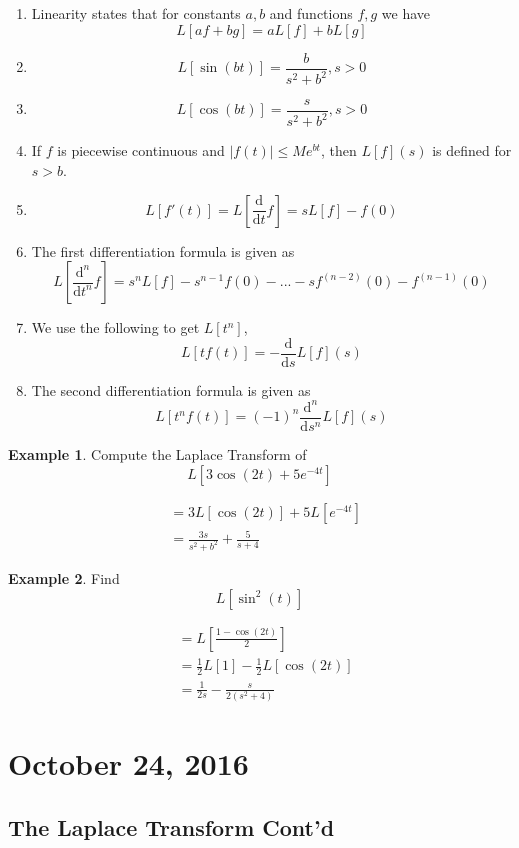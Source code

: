 \documentclass[11pt]{article}
\theoremstyle{plain} %
\theoremstyle{definition}
\theoremstyle{example}
\newtheorem*{example}{Example}
\theoremstyle{remark}
\begin{document}
\begin{enumerate}
\item Linearity states that for constants $a,b$ and functions $f,g$ we have $$L[af + bg] = aL[f] + bL[g]$$
\item $$L[\sin(bt)] = \frac{b}{s^2+b^2}, s > 0$$
\item $$L[\cos(bt)] = \frac{s}{s^2 + b^2}, s > 0$$
\item If $f$ is piecewise continuous and $|f(t)| \leq Me^{bt}$, then $L[f](s)$ is defined for $s > b$. 
\item $$L[f'(t)] = L\left[\frac{\mathrm d }{\mathrm d t} f \right] = sL[f] -f(0)$$
\item The first differentiation formula is given as $$L\left[\frac{\mathrm d^n}{\mathrm d t^n}f\right] = s^nL[f] -s^{n-1}f(0) - ... -sf^{(n-2)}(0) - f^{(n-1)}(0) $$
\item We use the following to get $L[t^n]$, $$L[tf(t)] = -\frac{\mathrm d }{\mathrm d s} L[f](s)$$
\item The second differentiation formula is given as $$L[t^nf(t)] = (-1)^n \frac{\mathrm d^n}{\mathrm d s^n}L[f](s)$$
\end{enumerate}

\begin{example}
Compute the Laplace Transform of $$L[3 \cos(2t) + 5e^{-4t}]$$
\end{example}

\begin{align*}
	&= 3L[\cos(2t)] + 5L[e^{-4t}] \\
	&= \frac{3s}{s^2+b^2} + \frac{5}{s+4}
\end{align*}

\begin{example}
Find $$L[\sin^2(t)]$$
\end{example}

\begin{align*}
&= L \left[\frac{1-\cos(2t)}{2} \right] \\
&= \frac{1}{2}L[1] - \frac{1}{2} L[\cos(2t)] \\
&= \frac{1}{2s} - \frac{s}{2\left(s^2+4\right)}
\end{align*}






\section{October 24, 2016}
\subsection{The Laplace Transform Cont'd}
\end{document}
